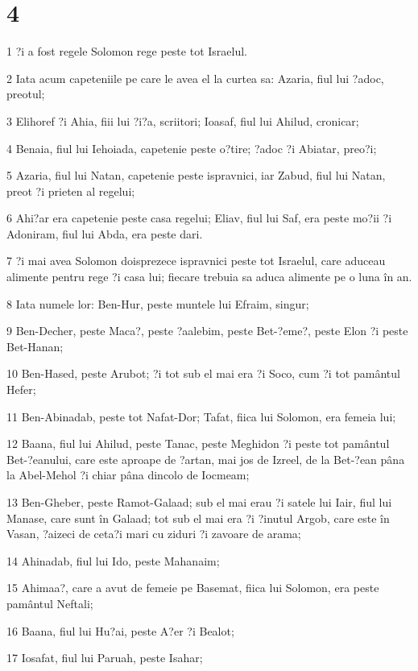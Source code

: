 \chapter{4}

\par 1 ?i a fost regele Solomon rege peste tot Israelul.
\par 2 Iata acum capeteniile pe care le avea el la curtea sa: Azaria, fiul lui ?adoc, preotul;
\par 3 Elihoref ?i Ahia, fiii lui ?i?a, scriitori; Ioasaf, fiul lui Ahilud, cronicar;
\par 4 Benaia, fiul lui Iehoiada, capetenie peste o?tire; ?adoc ?i Abiatar, preo?i;
\par 5 Azaria, fiul lui Natan, capetenie peste ispravnici, iar Zabud, fiul lui Natan, preot ?i prieten al regelui;
\par 6 Ahi?ar era capetenie peste casa regelui; Eliav, fiul lui Saf, era peste mo?ii ?i Adoniram, fiul lui Abda, era peste dari.
\par 7 ?i mai avea Solomon doisprezece ispravnici peste tot Israelul, care aduceau alimente pentru rege ?i casa lui; fiecare trebuia sa aduca alimente pe o luna în an.
\par 8 Iata numele lor: Ben-Hur, peste muntele lui Efraim, singur;
\par 9 Ben-Decher, peste Maca?, peste ?aalebim, peste Bet-?eme?, peste Elon ?i peste Bet-Hanan;
\par 10 Ben-Hased, peste Arubot; ?i tot sub el mai era ?i Soco, cum ?i tot pamântul Hefer;
\par 11 Ben-Abinadab, peste tot Nafat-Dor; Tafat, fiica lui Solomon, era femeia lui;
\par 12 Baana, fiul lui Ahilud, peste Tanac, peste Meghidon ?i peste tot pamântul Bet-?eanului, care este aproape de ?artan, mai jos de Izreel, de la Bet-?ean pâna la Abel-Mehol ?i chiar pâna dincolo de Iocmeam;
\par 13 Ben-Gheber, peste Ramot-Galaad; sub el mai erau ?i satele lui Iair, fiul lui Manase, care sunt în Galaad; tot sub el mai era ?i ?inutul Argob, care este în Vasan, ?aizeci de ceta?i mari cu ziduri ?i zavoare de arama;
\par 14 Ahinadab, fiul lui Ido, peste Mahanaim;
\par 15 Ahimaa?, care a avut de femeie pe Basemat, fiica lui Solomon, era peste pamântul Neftali;
\par 16 Baana, fiul lui Hu?ai, peste A?er ?i Bealot;
\par 17 Iosafat, fiul lui Paruah, peste Isahar;
